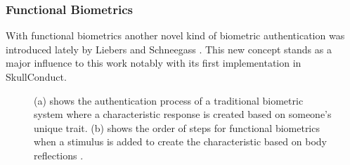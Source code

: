 \subsubsection{Functional Biometrics} With functional biometrics another novel kind of biometric authentication was introduced lately by Liebers and Schneegass \cite{schneegass2020functbiometric}.
This new concept stands as a major influence to this work notably with its first implementation in SkullConduct\cite{SkullConduct}. 
\begin{figure}
	\begin{center}
		\hspace{0.5cm}
	\end{center}
	\caption{(a) shows the authentication process of a traditional biometric system where a characteristic response is created based on someone's unique trait.
	(b) shows the order of steps for functional biometrics when a stimulus is added to create the characteristic based on body reflections \cite{schneegass2020functbiometric}.}
	\label{fig:biometricsVersions}
\end{figure}

